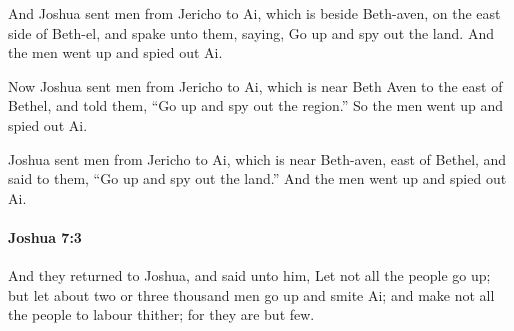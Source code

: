 			\begin{versebox}
					\item[BHS] 
					\item[ASV] And Joshua sent men from Jericho to Ai, which is beside Beth-aven, on the east side of Beth-el, and spake unto them, saying, Go up and spy out the land. And the men went up and spied out Ai.
					\item[NIV] Now Joshua sent men from Jericho to Ai, which is near Beth Aven to the east of Bethel, and told them, “Go up and spy out the region.” So the men went up and spied out Ai.
					\item[NRSV] Joshua sent men from Jericho to Ai, which is near Beth-aven, east of Bethel, and said to them, “Go up and spy out the land.” And the men went up and spied out Ai.
			\end{versebox}

		\paragraph{Joshua 7:3} %
			\label{JOSHUA-7-3}

			And they returned to Joshua, and said unto him, Let not all the people go up; but let about two or three thousand men go up and smite Ai; and make not all the people to labour thither; for they are but few.

